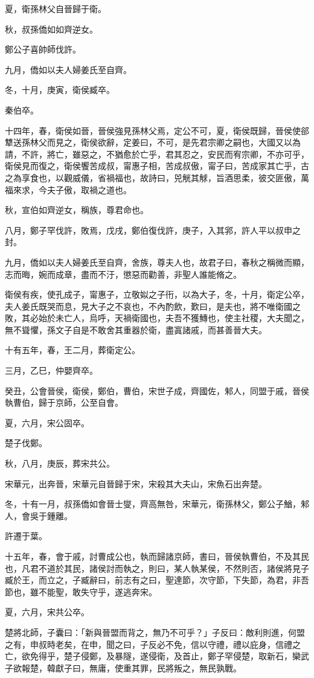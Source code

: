 \begin{pinyinscope}
夏，衛孫林父自晉歸于衛。

秋，叔孫僑如如齊逆女。

鄭公子喜帥師伐許。

九月，僑如以夫人婦姜氏至自齊。

冬，十月，庚寅，衛侯臧卒。

秦伯卒。

十四年，春，衛侯如晉，晉侯強見孫林父焉，定公不可，夏，衛侯既歸，晉侯使郤犨送孫林父而見之，衛侯欲辭，定姜曰，不可，是先君宗卿之嗣也，大國又以為請，不許，將亡，雖惡之，不猶愈於亡乎，君其忍之，安民而宥宗卿，不亦可乎，衛侯見而復之，衛侯饗苦成叔，甯惠子相，苦成叔傲，甯子曰，苦成家其亡乎，古之為享食也，以觀威儀，省禍福也，故詩曰，兕觥其觩，旨酒思柔，彼交匪傲，萬福來求，今夫子傲，取禍之道也。

秋，宣伯如齊逆女，稱族，尊君命也。

八月，鄭子罕伐許，敗焉，戊戌，鄭伯復伐許，庚子，入其郛，許人平以叔申之封。

九月，僑如以夫人婦姜氏至自齊，舍族，尊夫人也，故君子曰，春秋之稱微而顯，志而晦，婉而成章，盡而不汙，懲惡而勸善，非聖人誰能脩之。

衛侯有疾，使孔成子，甯惠子，立敬姒之子衎，以為大子，冬，十月，衛定公卒，夫人姜氏既哭而息，見大子之不哀也，不內酌飲，歎曰，是夫也，將不唯衛國之敗，其必始於未亡人，烏呼，天禍衛國也，夫吾不獲鱄也，使主社稷，大夫聞之，無不聳懼，孫文子自是不敢舍其重器於衛，盡寘諸戚，而甚善晉大夫。

十有五年，春，王二月，葬衛定公。

三月，乙巳，仲嬰齊卒。

癸丑，公會晉侯，衛侯，鄭伯，曹伯，宋世子成，齊國佐，邾人，同盟于戚，晉侯執曹伯，歸于京師，公至自會。

夏，六月，宋公固卒。

楚子伐鄭。

秋，八月，庚辰，葬宋共公。

宋華元，出奔晉，宋華元自晉歸于宋，宋殺其大夫山，宋魚石出奔楚。

冬，十有一月，叔孫僑如會晉士燮，齊高無咎，宋華元，衛孫林父，鄭公子鰌，邾人，會吳于鍾離。

許遷于葉。

十五年，春，會于戚，討曹成公也，執而歸諸京師，書曰，晉侯執曹伯，不及其民也，凡君不道於其民，諸侯討而執之，則曰，某人執某侯，不然則否，諸侯將見子臧於王，而立之，子臧辭曰，前志有之曰，聖達節，次守節，下失節，為君，非吾節也，雖不能聖，敢失守乎，遂逃奔宋。

夏，六月，宋共公卒。

楚將北師，子囊曰：「新與晉盟而背之，無乃不可乎？」子反曰：敵利則進，何盟之有，申叔時老矣，在申，聞之曰，子反必不免，信以守禮，禮以庇身，信禮之亡，欲免得乎，楚子侵鄭，及暴隧，遂侵衛，及首止，鄭子罕侵楚，取新石，欒武子欲報楚，韓獻子曰，無庸，使重其罪，民將叛之，無民孰戰。


\end{pinyinscope}
